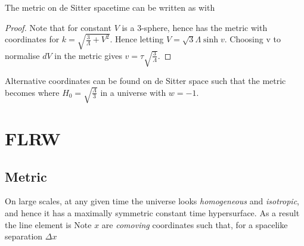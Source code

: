 \documentclass{article}
\begin{document}
\begin{prop}
The metric on de Sitter spacetime can be written as 
with 
\end{prop}
\begin{proof}
Note that for constant $V$ 
is a 3-sphere, hence has the metric 
with coordinates 
for $k=\sqrt{\frac{3}{\Lambda}+V^2}$. Hence letting $V=\sqrt{3}{\Lambda}\sinh v$. Choosing v to normalise $dV$ in the metric gives $v=\tau\sqrt{\frac{3}{\Lambda}}$. 
\end{proof}

\begin{prop}
Alternative coordinates can be found on de Sitter space such that the metric becomes 
where $H_0 = \sqrt{\frac{\Lambda}{3}}$ in a universe with $w=-1$. 
\end{prop}

\section{FLRW}
\subsection{Metric}
On large scales, at any given time the universe looks \emph{homogeneous} and \emph{isotropic}, and hence it has a maximally symmetric constant time hypersurface. As a result the line element is 
Note $x$ are \emph{comoving} coordinates such that, for a spacelike separation $\Delta x$
\end{document}
